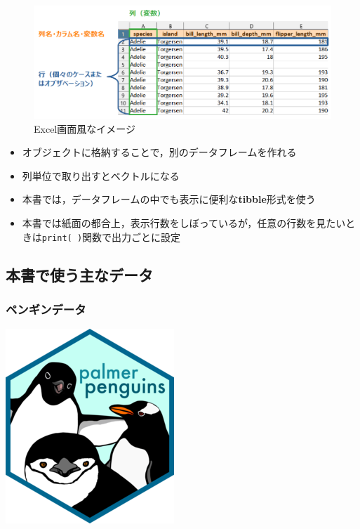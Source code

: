 \documentclass[
  xelatex,ja=standard, b5paper]{bxjsbook}
\providecommand{\tightlist}{%
  \setlength{\itemsep}{0pt}\setlength{\parskip}{0pt}}
\begin{document}
\begin{figure}

{\centering \includegraphics[width=0.6\linewidth]{images/df_xl} 

}

\caption{Excel画面風なイメージ}\label{fig:dfxl}
\end{figure}

\begin{itemize}
\tightlist
\item
  オブジェクトに格納することで，別のデータフレームを作れる
\item
  列単位で取り出すとベクトルになる
\item
  本書では，データフレームの中でも表示に便利な\textbf{tibble}形式を使う
\item
  本書では紙面の都合上，表示行数をしぼっているが，任意の行数を見たいときは\texttt{print(\ )}関数で出力ごとに設定
\end{itemize}

\hypertarget{p-df-main}{%
\subsection{本書で使う主なデータ}\label{p-df-main}}

\hypertarget{p-df-main-p}{%
\subsubsection{ペンギンデータ}\label{p-df-main-p}}

\includegraphics{images/penguins_logo.png}
\end{document}
